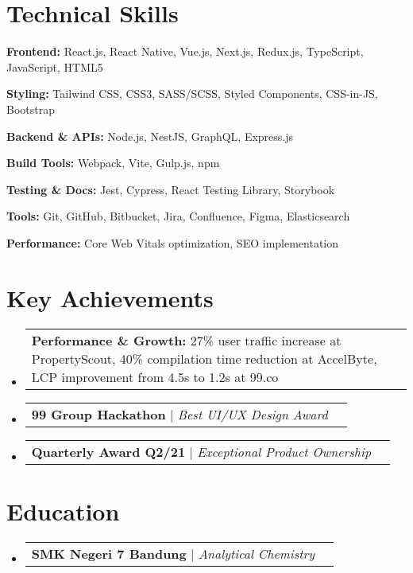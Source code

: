 \documentclass[a4paper, 11pt]{article}
\makeatletter
\newcommand{\resumeProjectHeading}[2]{
    \item
    \begin{tabular*}{0.987\textwidth}{l@{\extracolsep{\fill}}r}
      \small#1\\
    \end{tabular*}\vspace{-7pt}
}
\newcommand{\resumeSubHeadingListStart}{\begin{itemize}[leftmargin=0.1in, label={}]}
\newcommand{\resumeSubHeadingListEnd}{\end{itemize}\vspace{5pt}}
\makeatother
\begin{document}
\section{Technical Skills}
    \resumeSubHeadingListStart
        \small{
            \item \textbf{Frontend:} React.js, React Native, Vue.js, Next.js, Redux.js, TypeScript, JavaScript, HTML5
            \item \textbf{Styling:} Tailwind CSS, CSS3, SASS/SCSS, Styled Components, CSS-in-JS, Bootstrap
            \item \textbf{Backend \& APIs:} Node.js, NestJS, GraphQL, Express.js
            \item \textbf{Build Tools:} Webpack, Vite, Gulp.js, npm
            \item \textbf{Testing \& Docs:} Jest, Cypress, React Testing Library, Storybook
            \item \textbf{Tools:} Git, GitHub, Bitbucket, Jira, Confluence, Figma, Elasticsearch
            \item \textbf{Performance:} Core Web Vitals optimization, SEO implementation
        }
    \resumeSubHeadingListEnd

\section{Key Achievements}
    \resumeSubHeadingListStart
        \resumeProjectHeading
            {\textbf{Performance \& Growth:} 27\% user traffic increase at PropertyScout, 40\% compilation time reduction at AccelByte, LCP improvement from 4.5s to 1.2s at 99.co}{}
        \resumeProjectHeading
            {\textbf{99 Group Hackathon} $|$ \emph{Best UI/UX Design Award}}{2021}
        \resumeProjectHeading
            {\textbf{Quarterly Award Q2/21} $|$ \emph{Exceptional Product Ownership}}{2021}
    \resumeSubHeadingListEnd

\section{Education}
    \resumeSubHeadingListStart
        \resumeProjectHeading
            {\textbf{SMK Negeri 7 Bandung} $|$ \emph{Analytical Chemistry}}{2009 -- 2011}
    \resumeSubHeadingListEnd
\end{document}
